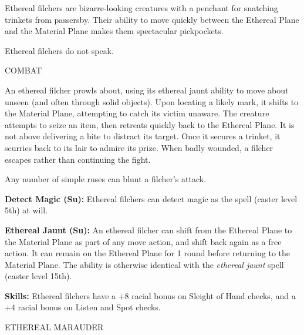 \documentclass{article}
\begin{document}
Ethereal filchers are bizarre-looking creatures with a penchant for snatching trinkets 
from passersby. Their ability to move quickly between the Ethereal Plane and the 
Material Plane makes them spectacular pickpockets.

Ethereal filchers do not speak.

COMBAT

An ethereal filcher prowls about, using its ethereal jaunt ability to move about 
unseen (and often through solid objects). Upon locating a likely mark, it shifts 
to the Material Plane, attempting to catch its victim unaware. The creature attempts 
to seize an item, then retreats quickly back to the Ethereal Plane. It is not above 
delivering a bite to distract its target. Once it secures a trinket, it scurries 
back to its lair to admire its prize. When badly wounded, a filcher escapes rather 
than continuing the fight.

Any number of simple ruses can blunt a filcher's attack.

\textbf{Detect Magic (Su):} Ethereal filchers can detect magic as the spell (caster 
level 5th) at will.

\textbf{Ethereal Jaunt (Su): }An ethereal filcher can shift from the Ethereal Plane 
to the Material Plane as part of any move action, and shift back again as a free 
action. It can remain on the Ethereal Plane for 1 round before returning to the 
Material Plane. The ability is otherwise identical with the \textit{ethereal jaunt 
}spell (caster level 15th).

\textbf{Skills:} Ethereal filchers have a +8 racial bonus on Sleight of Hand checks, 
and a +4 racial bonus on Listen and Spot checks.

\vspace{12pt}
{\LARGE{}ETHEREAL MARAUDER}
\end{document}
